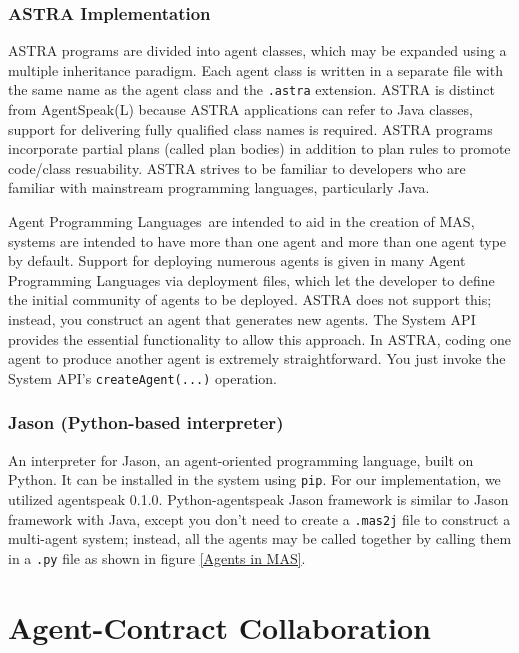 \subsubsection{ASTRA Implementation}

ASTRA programs are divided into agent classes, which may be expanded using a multiple inheritance paradigm. Each agent class is written in a separate file with the same name as the agent class and the \texttt{.astra} extension. ASTRA is distinct from AgentSpeak(L) because ASTRA applications can refer to Java classes, support for delivering fully qualified class names is required. ASTRA programs incorporate partial plans (called plan bodies) in addition to plan rules to promote code/class resuability. ASTRA strives to be familiar to developers who are familiar with mainstream programming languages, particularly Java.

 \vspace{.5cm}
 
Agent Programming Languages are intended to aid in the creation of \ac{MAS}, systems are intended to have more than one agent and more than one agent type by default. Support for deploying numerous agents is given in many Agent Programming Languages via deployment files, which let the developer to define the initial community of agents to be deployed. ASTRA does not support this; instead, you construct an agent that generates new agents. The System \ac{API} provides the essential functionality to allow this approach. In ASTRA, coding one agent to produce another agent is extremely straightforward. You just invoke the System \ac{API}'s \texttt{createAgent(...)} operation.

\subsubsection{Jason (Python-based interpreter)}

An interpreter for Jason, an agent-oriented programming language, built on Python. It can be installed in the system using \texttt{\ac{pip}}. For our implementation, we utilized agentspeak 0.1.0. Python-agentspeak Jason framework is similar to Jason framework with Java, except you don't need to create a \texttt{.mas2j} file to construct a multi-agent system; instead, all the agents may be called together by calling them in a \texttt{.py} file as shown in figure \ref{Agents in MAS}.


\section{Agent-Contract Collaboration}


